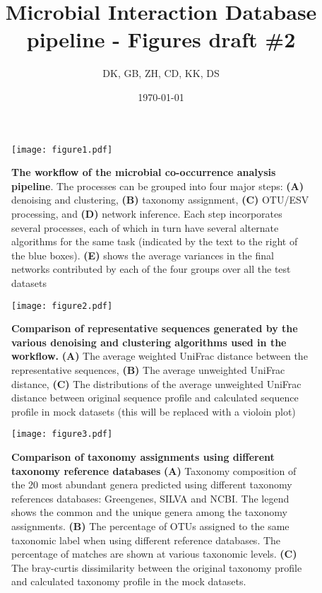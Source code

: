 




\title{ \huge Microbial Interaction Database pipeline - Figures draft \#2 }
\author{DK, GB, ZH, CD, KK, DS}
\date{\today}



\maketitle

\begin{figure}[h]
  \centering
  \texttt{[image: figure1.pdf]}
  \caption{
    \textbf{The workflow of the microbial co-occurrence analysis pipeline}.
    The processes can be grouped into four major steps: \textbf{(A)} denoising and clustering, \textbf{(B)} taxonomy assignment, \textbf{(C)} OTU/ESV processing, and \textbf{(D)} network inference.
    Each step incorporates several processes, each of which in turn have several alternate algorithms for the same task (indicated by the text to the right of the blue boxes).
    \textbf{(E)} shows the average variances in the final networks contributed by each of the four groups over all the test datasets
  }
  \label{fig:main_figure}
\end{figure}

\begin{figure}[h]
  \centering
  \texttt{[image: figure2.pdf]}
  \caption{
    \textbf{Comparison of representative sequences generated by the various denoising and clustering algorithms used in the workflow.}
    \textbf{(A)} The average weighted UniFrac distance between the representative sequences,
    \textbf{(B)} The average unweighted UniFrac distance,
    \textbf{(C)} The distributions of the average unweighted UniFrac distance between original sequence profile and calculated sequence profile in mock datasets (this will be replaced with a violoin plot)
  }
  \label{fig:figure2}
\end{figure}

\begin{figure}[h]
  \centering
  \texttt{[image: figure3.pdf]}
  \caption{
    \textbf{Comparison of taxonomy assignments using different taxonomy reference databases}
    \textbf{(A)} Taxonomy composition of the 20 most abundant genera predicted using different taxonomy references databases: Greengenes, SILVA and NCBI.
    The legend shows the common and the unique genera among the taxonomy assignments.
    \textbf{(B)} The percentage of OTUs assigned to the same taxonomic label when using different reference databases.
    The percentage of matches are shown at various taxonomic levels.
    \textbf{(C)} The bray-curtis dissimilarity between the original taxonomy profile and calculated taxonomy profile in the mock datasets.
  }
  \label{fig:figure3}
\end{figure}

